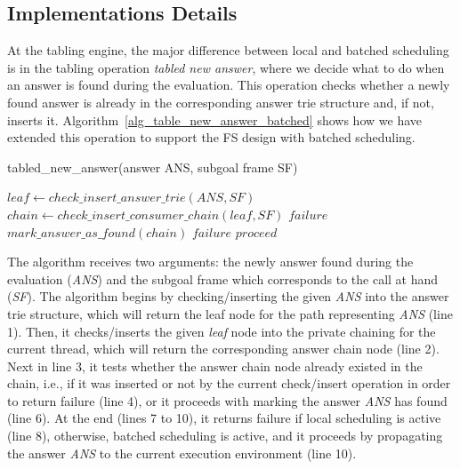 \documentclass{llncs}
\begin{document}

\subsection{Implementations Details}

At the tabling engine, the major difference between local and batched
scheduling is in the tabling operation \emph{tabled new answer}, where
we decide what to do when an answer is found during the
evaluation. This operation checks whether a newly found answer is
already in the corresponding answer trie structure and, if not,
inserts it. Algorithm~\ref{alg_table_new_answer_batched} shows how we
have extended this operation to support the FS design with batched
scheduling.

\begin{algorithm} [!ht]
\caption{tabled\_new\_answer(answer ANS, subgoal frame SF)}
\begin{algorithmic}[1]
  \STATE $leaf \gets check\_insert\_answer\_trie(ANS, SF)$
  \STATE $chain \gets check\_insert\_consumer\_chain(leaf, SF)$
    \RETURN $failure$
    \STATE $mark\_answer\_as\_found(chain)$
      \RETURN $failure$
      \RETURN $proceed$
    \ENDIF
  \ENDIF  
\end{algorithmic}
\label{alg_table_new_answer_batched}
\end{algorithm}

The algorithm receives two arguments: the newly answer found during
the evaluation (\emph{ANS}) and the subgoal frame which corresponds to
the call at hand (\emph{SF}). The algorithm begins by
checking/inserting the given \emph{ANS} into the answer trie
structure, which will return the leaf node for the path representing
\emph{ANS} (line 1). Then, it checks/inserts the given \emph{leaf}
node into the private chaining for the current thread, which will
return the corresponding answer chain node (line 2). Next in line 3,
it tests whether the answer chain node already existed in the chain,
i.e., if it was inserted or not by the current check/insert operation
in order to return failure (line 4), or it proceeds with marking the
answer \emph{ANS} has found (line 6). At the end (lines 7 to 10), it
returns failure if local scheduling is active (line 8), otherwise,
batched scheduling is active, and it proceeds by propagating the
answer \emph{ANS} to the current execution environment (line 10).
\end{document}
